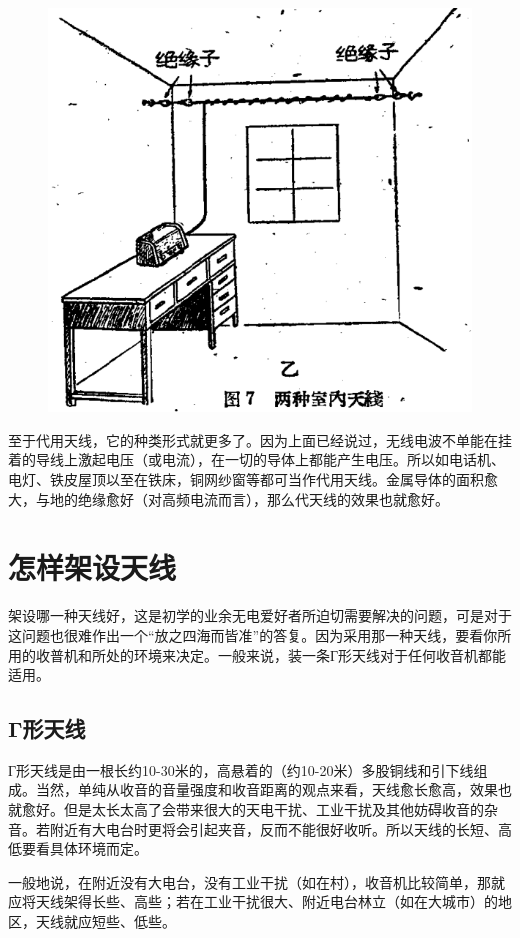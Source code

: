 \documentclass[12pt,UTF8]{ctexbook}
\begin{document}
\begin{figure}[htbp]
	\centering
	\includegraphics[width=0.7\linewidth]{8}
	\caption{}
	\label{fig:1}
\end{figure}

至于代用天线，它的种类形式就更多了。因为上面已经说过，无线电波不单能在挂着的导线上激起电压（或电流），在一切的导体上都能产生电压。所以如电话机、电灯、铁皮屋顶以至在铁床，铜网纱窗等都可当作代用天线。金属导体的面积愈大，与地的绝缘愈好（对高频电流而言），那么代天线的效果也就愈好。

\section{怎样架设天线}

架设哪一种天线好，这是初学的业余无电爱好者所迫切需要解决的问题，可是对于这问题也很难作出一个“放之四海而皆准”的答复。因为采用那一种天线，要看你所用的收普机和所处的环境来决定。一般来说，装一条Г形天线对于任何收音机都能适用。

\subsection{Γ形天线}

Г形天线是由一根长约10-30米的，高悬着的（约10-20米）多股铜线和引下线组成。当然，单纯从收音的音量强度和收音距离的观点来看，天线愈长愈高，效果也就愈好。但是太长太高了会带来很大的天电干扰、工业干扰及其他妨碍收音的杂音。若附近有大电台时更将会引起夹音，反而不能很好收听。所以天线的长短、高低要看具体环境而定。

一般地说，在附近没有大电台，没有工业干扰（如在村），收音机比较简单，那就应将天线架得长些、高些；若在工业干扰很大、附近电台林立（如在大城市）的地区，天线就应短些、低些。
\end{document}
